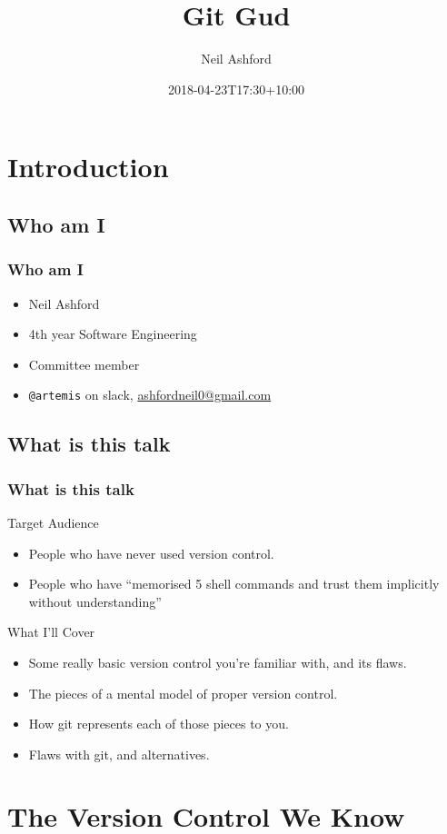 \documentclass{beamer}
\title{Git Gud}
\author{Neil Ashford}
\institute{UQ Computing Society}
\date{2018-04-23T17:30+10:00}
\begin{document}
\begin{frame}
    \titlepage
\end{frame}

\section{Introduction}

\subsection{Who am I}
\begin{frame}
    \frametitle{Who am I}
    \begin{itemize}[<+->]
        \item Neil Ashford
        \item 4th year Software Engineering
        \item Committee member
        \item \texttt{@artemis} on slack, \url{ashfordneil0@gmail.com}
    \end{itemize}
\end{frame}

\subsection{What is this talk}
\begin{frame}
    \frametitle{What is this talk}
    Target Audience
    \pause
    \begin{itemize}[<+->]
        \item People who have never used version control.
        \item People who have ``memorised 5 shell commands and trust them implicitly without understanding''
    \end{itemize}
    \pause
    What I'll Cover
    \begin{itemize}[<+->]
        \item Some really basic version control you're familiar with, and its flaws.
        \item The pieces of a mental model of proper version control.
        \item How git represents each of those pieces to you.
        \item Flaws with git, and alternatives.
    \end{itemize}
\end{frame}

\section{The Version Control We Know}
\end{document}
